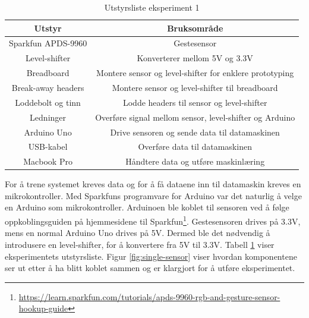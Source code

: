 \begin{table}[h!]
\caption{Utstyrsliste eksperiment 1}
\centering
\begin{tabular}{|| c c ||}
\hline
 Utstyr & Bruksområde \\
 \hline\hline
 Sparkfun APDS-9960 & Gestesensor \\ 
 \hline
 Level-shifter & Konverterer mellom 5V og 3.3V \\
 \hline
 Breadboard & Montere sensor og level-shifter for enklere prototyping \\ 
 \hline
 Break-away headers & Montere sensor og level-shifter til breadboard   \\ 
 \hline
 Loddebolt og tinn & Lodde headers til sensor og level-shifter\\
 \hline
 Ledninger & Overføre signal mellom sensor, level-shifter og Arduino \\
 \hline
 Arduino Uno & Drive sensoren og sende data til datamaskinen\\
 \hline
 USB-kabel & Overføre data til datamaskinen \\
 \hline
 Macbook Pro & Håndtere data og utføre maskinlæring\\
 \hline
\end{tabular}
\label{table:utstyrsliste}
\end{table}

For å trene systemet kreves data og for å få dataene inn til datamaskin kreves en mikrokontroller. Med Sparkfuns programvare for Arduino var det naturlig å velge en Arduino som mikrokontroller. Arduinoen ble koblet til sensoren ved å følge oppkoblingsguiden på hjemmesidene til Sparkfun\footnote{\url{https://learn.sparkfun.com/tutorials/apds-9960-rgb-and-gesture-sensor-hookup-guide}}. Gestesensoren drives på 3.3V, mens en normal Arduino Uno drives på 5V. Dermed ble det nødvendig å introdusere en level-shifter, for å konvertere fra 5V til 3.3V. Tabell \ref{table:utstyrsliste} viser eksperimentets utstyrsliste. Figur \ref{fig:single-sensor} viser hvordan komponentene ser ut etter å ha blitt koblet sammen og er klargjort for å utføre eksperimentet.

